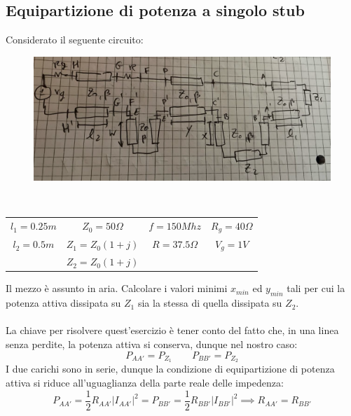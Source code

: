 \documentclass{book}
\begin{document}
    \subsection*{Equipartizione di potenza a singolo stub}
         Considerato il seguente circuito:
         \begin{figure}[h!]
            \center  
            \includegraphics[width=0.8\linewidth]{Chapter_two/Chapt2img22.png}
         \end{figure} \\
         \begin{center}
            \begin{tabular}{c c c c }
                $l_{1} = 0.25m$ & $Z_{0}=50 \Omega$ & $f=150Mhz$ & $R_{g} = 40 \Omega $ \\
                $l_{2}=0.5m$ & $Z_{1}=Z_{0}(1+j)$ & $R=37.5 \Omega$ & $V_{g} = 1V$ \\
                & $Z_{2} = Z_{0}(1+j)$ & &
             \end{tabular}
         \end{center}
         Il mezzo è assunto in aria. Calcolare i valori minimi $x_{min}$ ed $y_{min}$ tali per cui la potenza 
         attiva dissipata su $Z_{1}$  sia la stessa di quella dissipata su $Z_{2}$. \\ \\
         La chiave per risolvere quest'esercizio è tener conto del fatto che, in una linea senza perdite, la potenza attiva si
         conserva, dunque nel nostro caso:
         \begin{equation}
            P_{AA'}=P_{Z_{1}} \qquad P_{BB'}=P_{Z_{2}}
         \end{equation}
         I due carichi sono in serie, dunque la condizione di equipartizione di potenza 
         attiva si riduce all'uguaglianza della parte reale delle impedenza:
         \begin{equation}
            P_{AA'}=\frac{1}{2}R_{AA'}|I_{AA'}|^{2} = P_{BB'} = \frac{1}{2}R_{BB'}|I_{BB'}|^{2} \implies R_{AA'}=R_{BB'}
         \end{equation}
\end{document}
